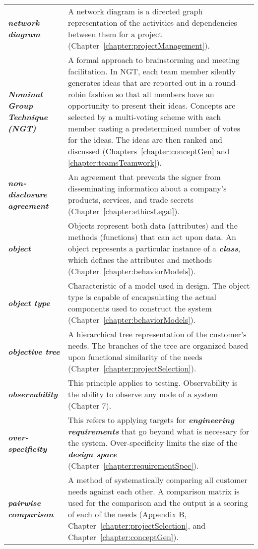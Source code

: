 \begin{longtable} { p{4cm} p{11cm}}
\emph{\textbf{network diagram}} & A network diagram is a directed graph
representation of the activities and dependencies between them for a
project (Chapter~\ref{chapter:projectManagement}). \\
\emph{\textbf{Nominal Group Technique (NGT)}} & A formal approach to
brainstorming and meeting facilitation. In NGT, each team member
silently generates ideas that are reported out in a round-robin fashion
so that all members have an opportunity to present their ideas. Concepts
are selected by a multi-voting scheme with each member casting a
predetermined number of votes for the ideas. The ideas are then ranked
and discussed (Chapters~\ref{chapter:conceptGen} and \ref{chapter:teamsTeamwork}). \\
\emph{\textbf{non-disclosure agreement}} & An agreement that prevents
the signer from disseminating information about a company's products,
services, and trade secrets (Chapter~\ref{chapter:ethicsLegal}). \\
\emph{\textbf{object}} & Objects represent both data (attributes) and
the methods (functions) that can act upon data. An object represents a
particular instance of a \emph{\textbf{class}}, which defines the
attributes and methods (Chapter~\ref{chapter:behaviorModels}). \\
\emph{\textbf{object type}} & Characteristic of a model used in design.
The object type is capable of encapsulating the actual components used
to construct the system (Chapter~\ref{chapter:behaviorModels}). \\
\emph{\textbf{objective tree}} & A hierarchical tree representation of
the customer's needs. The branches of the tree are organized based upon
functional similarity of the needs (Chapter~\ref{chapter:projectSelection}). \\
\emph{\textbf{observability}} & This principle applies to testing.
Observability is the ability to observe any node of a system (Chapter
7). \\
\emph{\textbf{over-specificity}} & This refers to applying targets for
\emph{\textbf{engineering requirements}} that go beyond what is
necessary for the system. Over-specificity limits the size of the
\emph{\textbf{design space}} (Chapter~\ref{chapter:requirementSpec}). \\
\emph{\textbf{pairwise comparison}} & A method of systematically
comparing all customer needs against each other. A comparison matrix is
used for the comparison and the output is a scoring of each of the needs
(Appendix B, Chapter~\ref{chapter:projectSelection}, and Chapter~\ref{chapter:conceptGen}). \\

\end{longtable}
